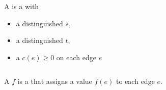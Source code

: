 
\begin{frame}{}
  \begin{definition}[Network (网络)]
    A  is a  with
    \begin{itemize}
      \setlength{\itemsep}{5pt}
      \item a distinguished  $s$,
      \item a distinguished  $t$,
      \item a  $c(e) \ge 0$ on each edge $e$
    \end{itemize}
  \end{definition}

  \vspace{0.30cm}
  \begin{columns}
  \end{columns}
\end{frame}

\begin{frame}{}
  \begin{definition}[Flow (流)]
    A  $f$ is a  that assigns a value $f(e)$ to each edge $e$.
  \end{definition}

  \vspace{0.30cm}
  \begin{columns}
  \end{columns}
\end{frame}

